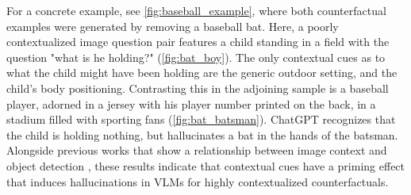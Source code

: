 For a concrete example, see \autoref{fig:baseball_example}, where both counterfactual examples were generated by removing a baseball bat. Here, a poorly contextualized image question pair features a child standing in a field with the question "what is he holding?" (\autoref{fig:bat_boy}). The only contextual cues as to what the child might have been holding are the generic outdoor setting, and the child's body positioning. Contrasting this in the adjoining sample is a baseball player, adorned in a jersey with his player number printed on the back, in a stadium filled with sporting fans (\autoref{fig:bat_batsman}). ChatGPT recognizes that the child is holding nothing, but hallucinates a bat in the hands of the batsman. Alongside previous works that show a relationship between image context and object detection \citep{beery2018recognition}, these results indicate that contextual cues have a priming effect that induces hallucinations in VLMs for highly contextualized counterfactuals.



